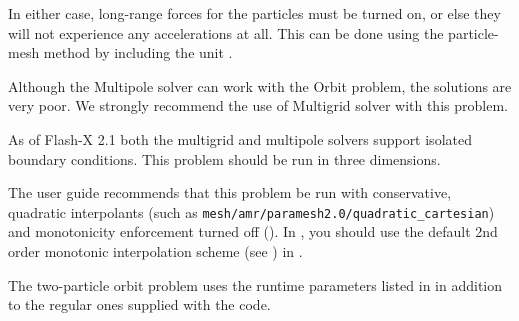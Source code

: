 In either case,
long-range forces for the particles must be turned on, or else they
will not experience any accelerations at all. This can be done using
the particle-mesh method by including the unit
. 


\begin{flashtip}
Although the Multipole solver can work with the Orbit problem,
the solutions are very poor.  We strongly recommend the use of 
Multigrid solver with this problem.
\end{flashtip}

As of Flash-X 2.1 both the multigrid and multipole solvers
support isolated boundary conditions.  This problem should be run in
three dimensions.

\begin{flashtip}
The \flashx user guide recommends that this problem be run with
conservative, quadratic interpolants (such as
\texttt{mesh/amr/paramesh2.0/quadratic\_cartesian}) and monotonicity
enforcement turned off ().  In \flashx,
you should use the default 2nd order monotonic interpolation scheme
(see ) in .
\end{flashtip}

The two-particle orbit problem uses the runtime parameters listed in
 in addition to the regular ones
supplied with the code. 

